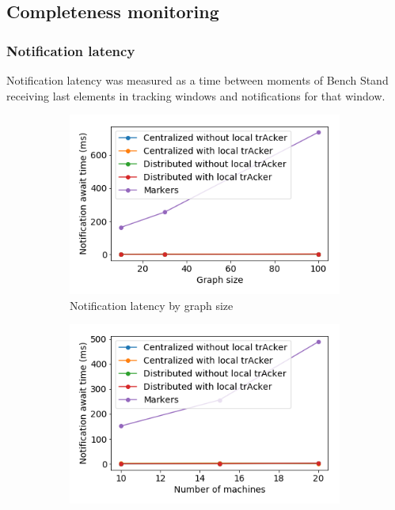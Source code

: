 \subsection{Completeness monitoring} \label{completeness}

\subsubsection{Notification latency}

Notification latency was measured as a time between moments of Bench Stand receiving last elements in tracking windows and notifications for that window.

\begin{figure}[t!]
    \begin{subfigure}[b]{0.32\textwidth}
            \includegraphics[width=0.99\textwidth]{pics/notification_await_time_by_graph_size.png}
            \caption{Notification latency by graph size}
    \end{subfigure}
    \hspace{5mm}
    \begin{subfigure}[b]{0.32\textwidth}
            \includegraphics[width=0.99\textwidth]{pics/notification_await_time_by_number_of_machines.png}

\end{subfigure}
\end{figure}
